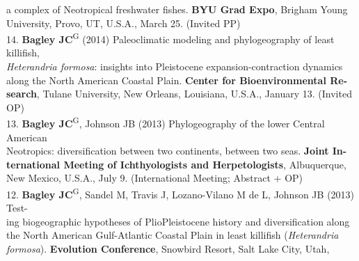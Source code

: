 \documentclass[margin,line]{res}
\begin{document}
\begin{resume}
\hspace*{8mm} a complex of Neotropical freshwater fishes. \textbf{BYU Grad Expo}, Brigham Young\\ \vspace{2mm}
\hspace*{8mm}University, Provo, UT, U.S.A., March 25. (Invited PP) \\
14. \textbf{Bagley JC}\textsuperscript{G} (2014) Paleoclimatic modeling and phylogeography of least killifish,\\
\hspace*{8mm} \emph{Heterandria formosa}: insights into Pleistocene expansion-contraction dynamics\\
\hspace*{8mm} along the North American Coastal Plain. \textbf{Center for Bioenvironmental Re-}\\
\hspace*{8mm} \textbf{search}, Tulane University, New Orleans, Louisiana, U.S.A., January 13. (Invited\\ \vspace{2mm}
\hspace*{8mm}OP) \\
13. \textbf{Bagley JC}\textsuperscript{G}, Johnson JB (2013) Phylogeography of the lower Central American\\
\hspace*{8mm} Neotropics: diversification between two continents, between two seas. \textbf{Joint In-}\\
\hspace*{8mm} \textbf{ternational Meeting of Ichthyologists and Herpetologists}, Albuquerque,\\ \vspace{2mm}
\hspace*{8mm}New Mexico, U.S.A., July 9. (International Meeting; Abstract + OP) \\
12. \textbf{Bagley JC}\textsuperscript{G}, Sandel M, Travis J, Lozano-Vilano M de L, Johnson JB (2013) Test-\\
\hspace*{8mm} ing biogeographic hypotheses of Plio\textemdash Pleistocene history and diversification along the North American Gulf-Atlantic Coastal Plain in least killifish (\emph{Heterandria}\\
\hspace*{8mm} \emph{formosa}). \textbf{Evolution Conference}, Snowbird Resort, Salt Lake City, Utah,\\ \vspace{2mm}

\end{resume}
\end{document}
